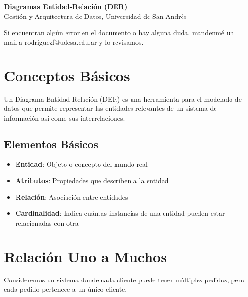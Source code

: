 \documentclass[12pt]{article}
\begin{document}
\begin{center}
  {\LARGE \textbf{Diagramas Entidad-Relación (DER)}}\\[0.5em]
  {Gestión y Arquitectura de Datos, Universidad de San Andrés}
\end{center}

Si encuentran algún error en el documento o hay alguna duda, mandenmé un mail a rodriguezf@udesa.edu.ar y lo revisamos.

\section{Conceptos Básicos}
Un Diagrama Entidad-Relación (DER) es una herramienta para el modelado de datos que permite representar las entidades relevantes de un sistema de información así como sus interrelaciones.

\subsection{Elementos Básicos}
\begin{itemize}
    \item \textbf{Entidad}: Objeto o concepto del mundo real
    \item \textbf{Atributos}: Propiedades que describen a la entidad
    \item \textbf{Relación}: Asociación entre entidades
    \item \textbf{Cardinalidad}: Indica cuántas instancias de una entidad pueden estar relacionadas con otra
\end{itemize}

\section{Relación Uno a Muchos}
Consideremos un sistema donde cada cliente puede tener múltiples pedidos, pero cada pedido pertenece a un único cliente.

\begin{center}
\end{center}
\end{document}
